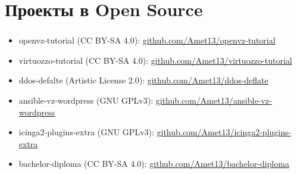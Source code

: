 
\section{Проекты в Open Source}

\begin{frame}
\frametitle{\insertsection}
\begin{itemize}
	\item openvz-tutorial (CC BY-SA 4.0): \href{https://github.com/Amet13/openvz-tutorial}{github.com/Amet13/openvz-tutorial}
	\item virtuozzo-tutorial (CC BY-SA 4.0): \href{https://github.com/Amet13/virtuozzo-tutorial}{github.com/Amet13/virtuozzo-tutorial}
	\item ddos-defalte (Artistic License 2.0): \href{https://github.com/Amet13/ddos-deflate}{github.com/Amet13/ddos-deflate}
	\item ansible-vz-wordpress (GNU GPLv3): \href{https://github.com/Amet13/ansible-vz-wordpress}{github.com/Amet13/ansible-vz-wordpress}
	\item icinga2-plugins-extra (GNU GPLv3): \href{https://github.com/Amet13/icinga2-plugins-extra}{github.com/Amet13/icinga2-plugins-extra}
	\item bachelor-diploma (CC BY-SA 4.0): \href{https://github.com/Amet13/bachelor-diploma}{github.com/Amet13/bachelor-diploma}
\end{itemize}
\end{frame}


\frame[plain]{\titlepage} %
